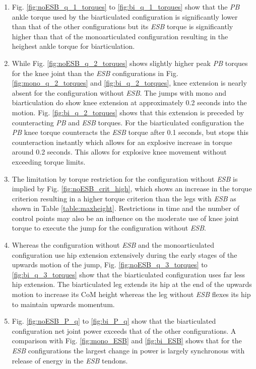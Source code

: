 \documentclass[letterpaper, 10 pt, conference]{ieeeconf}  %
\begin{document}
\begin{enumerate}
	\item Fig. \ref{fig:noESB_q_1_torques} to \ref{fig:bi_q_1_torques} show that the \textit{PB} ankle torque used by the biarticulated configuration is significantly lower than that of the other configurations but its \textit{ESB} torque is significantly higher than that of the monoarticulated configuration resulting in the heighest ankle torque for biarticulation. 
	
	\item While Fig. \ref{fig:noESB_q_2_torques} shows slightly higher peak \textit{PB} torques for the knee joint than the \textit{ESB} configurations in Fig. \ref{fig:mono_q_2_torques} and \ref{fig:bi_q_2_torques}, knee extension is nearly absent for the configuration without \textit{ESB}. The jumps with mono and biarticulation do show knee extension at approximately 0.2 seconds into the motion. Fig. \ref{fig:bi_q_2_torques} shows that this extension is preceded by counteracting \textit{PB} and \textit{ESB} torques. For the biarticulated configuration the \textit{PB} knee torque counteracts the \textit{ESB} torque after 0.1 seconds, but stops this counteraction instantly which allows for an explosive increase in torque around 0.2 seconds. This allows for explosive knee movement without exceeding torque limits.
	
	\item The limitation by torque restriction for the configuration without \textit{ESB} is implied by Fig. \ref{fig:noESB_crit_high}, which shows an increase in the torque criterion resulting in a higher torque criterion than the legs with \textit{ESB} as shown in Table \ref{table:maxheight}. Restrictions in time and the number of control points may also be an influence on the moderate use of knee joint torque to execute the jump for the configuration without \textit{ESB}.
	
	\item Whereas the configuration without \textit{ESB} and the monoarticulated configuration use hip extension extensively during the early stages of the upwards motion of the jump, Fig. \ref{fig:noESB_q_3_torques} to \ref{fig:bi_q_3_torques} show that the biarticulated configuration uses far less hip extension. The biarticulated leg extends its hip at the end of the upwards motion to increase its CoM height whereas the leg without \textit{ESB} flexes its hip to maintain upwards momentum.
	
	\item Fig. \ref{fig:noESB_P_q} to \ref{fig:bi_P_q} show that the biarticulated configuration net joint power exceeds that of the other configurations. A comparison with Fig. \ref{fig:mono_ESB} and \ref{fig:bi_ESB} shows that for the \textit{ESB} configurations the largest change in power is largely synchronous with release of energy in the \textit{ESB} tendons.
	
\end{enumerate}
\end{document}
